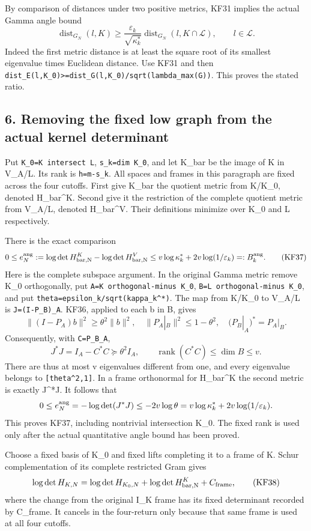 By comparison of distances under two positive metrics, KF31 implies the actual Gamma angle bound \[
\operatorname{dist}_{G_N}(l,K)
\ge\frac{\varepsilon_k}{\sqrt{\kappa_k^*}}
 \operatorname{dist}_{G_N}(l,K\cap\mathcal L),\qquad l\in\mathcal L.
\tag{KF36}
\] Indeed the first metric distance is at least the square root of its smallest eigenvalue times Euclidean distance. Use KF31 and then \nolinkurl{dist_E(l,K_0)>=dist_G(l,K_0)/sqrt(lambda_max(G))}. This proves the stated ratio.

\subsection{6. Removing the fixed low graph from the actual kernel determinant}\label{removing-the-fixed-low-graph-from-the-actual-kernel-determinant}

Put \nolinkurl{K_0=K intersect L}, \texttt{s\_k=dim\ K\_0}, and let K\_bar be the image of K in V\_A/L. Its rank is \texttt{h=m-s\_k}. All spaces and frames in this paragraph are fixed across the four cutoffs. First give K\_bar the quotient metric from K/K\_0, denoted H\_bar\^{}K. Second give it the restriction of the complete quotient metric from V\_A/L, denoted H\_bar\^{}V. Their definitions minimize over K\_0 and L respectively.

There is the exact comparison \[
0\le e_N^{\rm ang}:=
\log\det H_{\rm bar,N}^K-\log\det H_{\rm bar,N}^V
\le v\log\kappa_k^*+2v\log(1/\varepsilon_k)=:B_k^{\rm ang}.
\tag{KF37}
\] Here is the complete subspace argument. In the original Gamma metric remove K\_0 orthogonally, put \nolinkurl{A=K orthogonal-minus K_0}, \nolinkurl{B=L orthogonal-minus K_0}, and put \nolinkurl{theta=epsilon_k/sqrt(kappa_k^*)}. The map from K/K\_0 to V\_A/L is \texttt{J=(I-P\_B)\textbar{}\_A}. KF36, applied to each b in B, gives \[
\|(I-P_A)b\|^2\ge\theta^2\|b\|^2,
\quad\|P_A|_B\|^2\le1-\theta^2,
\quad(P_B|_A)^*=P_A|_B.
\] Consequently, with \texttt{C=P\_B\textbar{}\_A}, \[
J^*J=I_A-C^*C\succeq\theta^2 I_A,
\qquad \operatorname{rank}(C^*C)\le\dim B\le v.
\] There are thus at most v eigenvalues different from one, and every eigenvalue belongs to \texttt{{[}theta\^{}2,1{]}}. In a frame orthonormal for H\_bar\^{}K the second metric is exactly J\^{}*J. It follows that \[
0\le e_N^{\rm ang}=-\log\det(J^*J)
\le-2v\log\theta
=v\log\kappa_k^*+2v\log(1/\varepsilon_k).
\] This proves KF37, including nontrivial intersection K\_0. The fixed rank is used only after the actual quantitative angle bound has been proved.

Choose a fixed basis of K\_0 and fixed lifts completing it to a frame of K. Schur complementation of its complete restricted Gram gives \[
\log\det H_{K,N}=\log\det H_{K_0,N}
 +\log\det H_{\rm bar,N}^K+C_{\rm frame},
\tag{KF38}
\] where the change from the original I\_K frame has its fixed determinant recorded by C\_frame. It cancels in the four-return only because that same frame is used at all four cutoffs.

